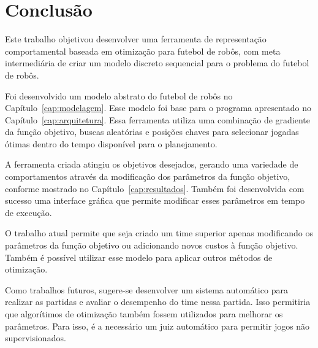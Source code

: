 \chapter{Conclusão}\label{cap:conclusao}


Este trabalho objetivou desenvolver uma ferramenta de representação
comportamental baseada em otimização para futebol de robôs, com meta
intermediária de criar um modelo discreto sequencial para o problema do futebol
de robôs.

Foi desenvolvido um modelo abstrato do futebol de robôs no
Capítulo~\ref{cap:modelagem}.  Esse modelo foi base para o programa apresentado
no Capítulo~\ref{cap:arquitetura}.  Essa ferramenta utiliza uma combinação de
gradiente da função objetivo, buscas aleatórias e posições chaves para
selecionar jogadas ótimas dentro do tempo disponível para o planejamento.

A ferramenta criada atingiu os objetivos desejados, gerando uma variedade de
comportamentos através da modificação dos parâmetros da função objetivo,
conforme mostrado no Capítulo~\ref{cap:resultados}.  Também foi desenvolvida com
sucesso uma interface gráfica que permite modificar esses parâmetros em tempo de
execução.

O trabalho atual permite que seja criado um time superior apenas modificando os
parâmetros da função objetivo ou adicionando novos custos à função objetivo.
Também é possível utilizar esse modelo para aplicar outros métodos de otimização.

Como trabalhos futuros, sugere-se desenvolver um sistema automático para
realizar as partidas e avaliar o desempenho do time nessa partida.  Isso
permitiria que algorítimos de otimização também fossem utilizados para
melhorar os parâmetros.  Para isso, é a necessário um juiz automático
para permitir jogos não supervisionados.

